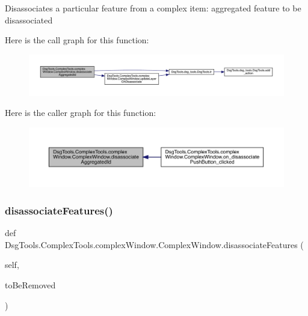 \begin{DoxyVerb}Disassociates a particular feature from a complex
item: aggregated feature to be disassociated
\end{DoxyVerb}
 Here is the call graph for this function\+:
\nopagebreak
\begin{figure}[H]
\begin{center}
\leavevmode
\includegraphics[width=350pt]{class_dsg_tools_1_1_complex_tools_1_1complex_window_1_1_complex_window_a368acb25b3069036d4970c74c8123c6f_cgraph}
\end{center}
\end{figure}
Here is the caller graph for this function\+:
\nopagebreak
\begin{figure}[H]
\begin{center}
\leavevmode
\includegraphics[width=350pt]{class_dsg_tools_1_1_complex_tools_1_1complex_window_1_1_complex_window_a368acb25b3069036d4970c74c8123c6f_icgraph}
\end{center}
\end{figure}
\mbox{\label{class_dsg_tools_1_1_complex_tools_1_1complex_window_1_1_complex_window_a3efb68c68cbf91f00a3432f53e965d2b}} 
\subsubsection{\texorpdfstring{disassociate\+Features()}{disassociateFeatures()}}
{\footnotesize\ttfamily def Dsg\+Tools.\+Complex\+Tools.\+complex\+Window.\+Complex\+Window.\+disassociate\+Features (\begin{DoxyParamCaption}\item[{}]{self,  }\item[{}]{to\+Be\+Removed }\end{DoxyParamCaption})}

